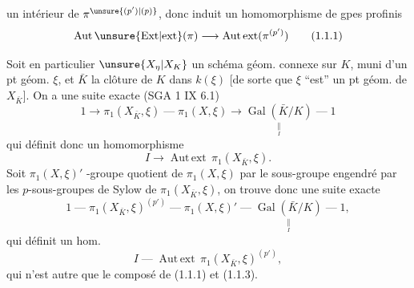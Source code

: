 un  intérieur de $\pi^{\unsure{(p')|(p)}}$, donc induit un homomorphisme de gpes profinis
\[
\operatorname{Aut\,\unsure{Ext|ext}}(\pi)\longrightarrow\operatorname{Aut\,ext}(\pi^{(p')})
\tag*{(1.1.1)}
\]

Soit en particulier $\unsure{X_\eta|X_K}$ un schéma géom. connexe sur $K$,  muni d'un pt géom. $\xi$, et $\bar K$ la clôture  de $K$ dans $k(\xi)$ [de sorte que $\xi$ ``est'' un pt géom. de $X_{\bar K}$]. On a une suite exacte (SGA 1 IX 6.1)
\[
1\to\pi_1(X_{\bar K},\xi)\mathrel{\text{---}}\pi_1(X,\xi)\longrightarrow
\underset{\underset{I}{\Vert}}{\operatorname{Gal}(\bar K/K)}\mathrel{\text{---}}1
\tag*{(1.1.2)}
\]
qui définit donc un homomorphisme
\[
I\longrightarrow\operatorname{Aut\,ext}\,\pi_1(X_{\bar K},\xi).
\tag*{(1.1.3)}
\]
Soit $\pi_1(X,\xi)'$   -groupe quotient de $\pi_1(X,\xi)$ par le sous-groupe   engendré par les $p$-sous-groupes de Sylow de $\pi_1(X_{\bar K},\xi)$, on trouve donc une suite exacte
\[
1\mathrel{\text{---}}\pi_1(X_{\bar K},\xi)^{(p')}\mathrel{\text{---}}\pi_1(X,\xi)'\mathrel{\text{---}}
\underset{\underset{I}{\Vert}}{\operatorname{Gal}(\bar K/K)}\mathrel{\text{---}}1,
\tag*{(1.1.4)}
\]
qui définit un hom.
\[
I\mathrel{\text{---}}\operatorname{Aut\,ext}\,\pi_1(X_{\bar K},\xi)^{(p')},
\tag*{(1.1.5)}
\]
qui n'est autre que le composé de (1.1.1) et (1.1.3).
